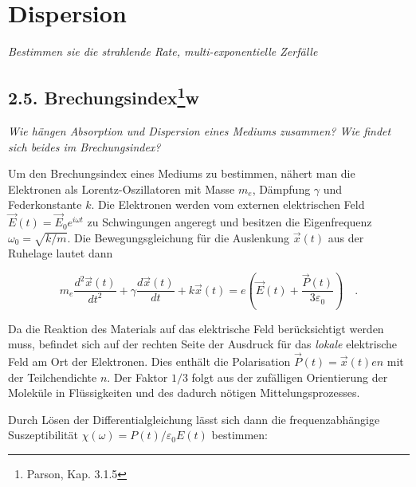 

\chapter{Dispersion}

\textit{Bestimmen sie die strahlende Rate, multi-exponentielle Zerfälle
}






\section{2.5. Brechungsindex\protect\footnote{Parson, Kap. 3.1.5}\hfill w} 

\textit{Wie hängen Absorption und Dispersion eines Mediums zusammen?
Wie findet sich beides im Brechungsindex?}

Um den Brechungsindex eines Mediums zu bestimmen, nähert man die Elektronen als Lorentz-Oszillatoren mit Masse $m_{e}$, Dämpfung $\gamma$ und Federkonstante $k$. Die Elektronen werden vom externen elektrischen Feld $\vec{E}(t) = \vec{E}_{0} e^{i \omega t}$ zu Schwingungen angeregt und besitzen die Eigenfrequenz $\omega_{0} = \sqrt{k / m}$. Die Bewegungsgleichung für die Auslenkung $\vec{x}(t)$ aus der Ruhelage lautet dann

\begin{equation}
    m_{e} \frac{d^{2}\vec{x}(t)}{dt^{2}} + \gamma \frac{d\vec{x}(t)}{dt} + k \vec{x}(t) = e \left( \vec{E}(t) + \frac{\vec{P}(t)}{3\varepsilon_{0}} \right) \quad .
\end{equation}

Da die Reaktion des Materials auf das elektrische Feld berücksichtigt werden muss, befindet sich auf der rechten Seite der Ausdruck für das \emph{lokale} elektrische Feld am Ort der Elektronen. Dies enthält die Polarisation $\vec{P}(t) = \vec{x}(t) e n$ mit der Teilchendichte $n$. Der Faktor $1/3$ folgt aus der zufälligen Orientierung der Moleküle in Flüssigkeiten und des dadurch nötigen Mittelungsprozesses.

Durch Lösen der Differentialgleichung lässt sich dann die frequenzabhängige Suszeptibilität $\chi(\omega) = P(t) / \varepsilon_{0} E(t)$ bestimmen:

